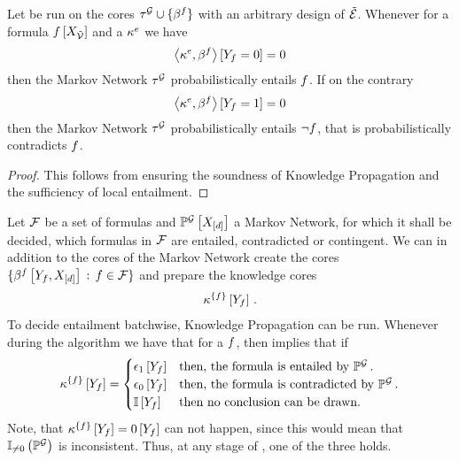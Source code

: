 \begin{corollary}
    \label{cor:knowledgePropagationMarkovNetworks}
    Let  be run on the cores $\tau^{\mathcal{G}}\cup\{\beta^{f}\}$ with an arbitrary design of $\tilde{\mathcal{E}}$.
    Whenever for a formula $f\left[X_{\tilde{\mathcal{V}}}\right]$ and a $\kappa^{e}$ we have
    \[ \left\langle \kappa^{e},\beta^{f}\right\rangle \left[ Y_{f}=0 \right] =0  \]
    then the Markov Network $\tau^{\mathcal{G}}$ probabilistically entails $f$.
    If on the contrary
    \[ \left\langle \kappa^{e},\beta^{f}\right\rangle \left[ Y_{f}=1 \right] =0  \]
    then the Markov Network $\tau^{\mathcal{G}}$ probabilistically entails $\lnot f$, that is probabilistically contradicts $f$.
\end{corollary}
\begin{proof}
    This follows from  ensuring the soundness of Knowledge Propagation and the sufficiency of local entailment.
\end{proof}

\begin{example}
    Let $\mathcal{F}$ be a set of formulas and $\mathbb{P}^{\mathcal{G}}\left[X_{[d]}\right]$ a Markov Network, for which it shall be decided, which formulas in $\mathcal{F}$ are entailed, contradicted or contingent.
    We can in addition to the cores of the Markov Network create the cores $\{\beta^{f}\left[Y_{f},X_{[d]}\right] \, : \, f\in\mathcal{F}\}$ and prepare the knowledge cores
    \begin{align*}
        \kappa^{\{f\}}\left[Y_{f}\right] \, .
    \end{align*}
    To decide entailment batchwise, Knowledge Propagation  can be run.
    Whenever during the algorithm we have that for a $f$, then  implies that if
    \begin{align*}
        \kappa^{\{f\}}\left[Y_{f}\right] =
        \begin{cases}
            \epsilon_1\left[Y_{f}\right] & \text{then, the formula is entailed by }\mathbb{P}^{\mathcal{G}} \, . \\
            \epsilon_0\left[Y_{f}\right] & \text{then, the formula is contradicted by }\mathbb{P}^{\mathcal{G}} \, .\\
            \mathbb{I}\left[Y_{f}\right] & \text{then no conclusion can be drawn.}
        \end{cases}
    \end{align*}
    Note, that $\kappa^{\{f\}}\left[Y_{f}\right] = 0\left[Y_{f}\right]$ can not happen, since this would mean that $\mathbb{I}_{\neq0}\left(\mathbb{P}^{\mathcal{G}}\right)$ is inconsistent.
    Thus, at any stage of , one of the three holds.
\end{example}


